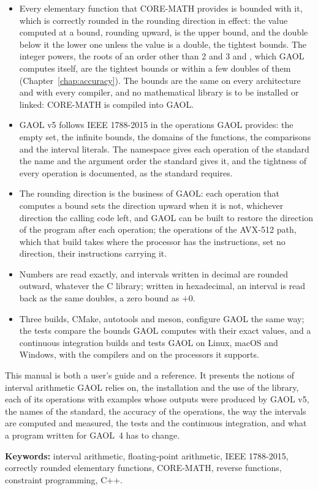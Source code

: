 \begin{itemize}
\item[$\bullet$] Every elementary function that CORE-MATH provides is bounded
  with it, which is correctly rounded in the rounding direction in effect: the
  value computed at a bound, rounding upward, is the upper bound, and the
  double below it the lower one unless the value is a double, the tightest
  bounds. The integer powers, the
  roots of an order other than 2 and 3 and , which GAOL computes itself, are the tightest
  bounds or within a few doubles of them (Chapter~\ref{chap:accuracy}). The
  bounds are the same on every architecture and with every compiler, and no
  mathematical library is to be installed or linked: CORE-MATH is compiled
  into GAOL.
\item[$\bullet$] GAOL v5 follows IEEE 1788-2015 in the operations GAOL
  provides: the empty set, the infinite bounds, the domains of the functions,
  the comparisons and the interval literals. The namespace
   gives each operation of the standard the name and the
  argument order the standard gives it, and the tightness of every operation
  is documented, as the standard requires.
\item[$\bullet$] The rounding direction is the business of GAOL: each
  operation that computes a bound sets the direction upward when it is not,
  whichever direction the calling code left, and GAOL can be built to restore
  the direction of the program after each operation; the operations of the
  AVX-512 path, which that build takes where the processor has the
  instructions, set no direction, their instructions carrying it.
\item[$\bullet$] Numbers are read exactly, and intervals written in decimal
  are rounded outward, whatever the C library; written in hexadecimal, an
  interval is read back as the same doubles, a zero bound as $+0$.
\item[$\bullet$] Three builds, CMake, autotools and meson, configure GAOL the
  same way; the tests compare the bounds GAOL computes with their exact
  values, and a continuous integration builds and tests GAOL on Linux, macOS
  and Windows, with the compilers and on the processors it supports.
\end{itemize}

\medskip
\noindent
This manual is both a user's guide and a reference. It presents the notions
of interval arithmetic GAOL relies on, the installation and the use of the
library, each of its operations with examples whose outputs were produced by
GAOL v5, the names of the standard, the accuracy of the operations, the way
the intervals are computed and measured, the tests and the continuous
integration, and what a program written for GAOL~4 has to change.

\bigskip
\noindent\textbf{Keywords:} interval arithmetic, floating-point arithmetic,
IEEE 1788-2015, correctly rounded elementary functions, CORE-MATH, reverse
functions, constraint programming, C++.
